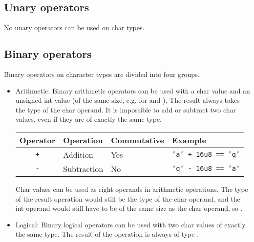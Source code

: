 \subsection{Unary operators}
\label{sec:org78546fb}

No unary operators can be used on char types.

\subsection{Binary operators}
\label{sec:orge863f7d}

Binary operators on character types are divided into four groups.

\begin{itemize}
\item Arithmetic: Binary arithmetic operators can be used with a char value and
  an unsigned int value (of the same size, e.g. for  and
  ). The result always takes the type of the char operand. It is
  impossible to add or subtract two char values, even if they are of exactly the
  same type.

  \begin{center}
    \vspace{-5pt}\begin{adjustbox}{max width=1.0\linewidth}
      \begin{tabular}{|c|lll|}
        \hline
        Operator & Operation & Commutative & Example\\[0pt]
        \hline
        \hline
        \texttt{+} & Addition & Yes & \texttt{'a' + 16u8 == 'q'}\\[0pt]
        \texttt{-} & Subtraction & No & \texttt{'q' - 16u8 == 'a'}\\[0pt]
        \hline
      \end{tabular}
  \end{adjustbox}\end{center}


  Char values can be used as right operands in arithmetic operations. The type of
  the result operation would still be the type of the char operand, and the int
  operand would still have to be of the same size as the char operand, so
  .

\item Logical: Binary logical operators can be used with two char values of
  exactly the same type. The result of the operation is always of type
  .


\end{itemize}
